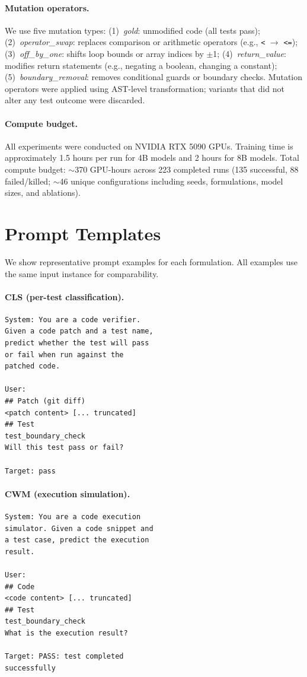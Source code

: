 \paragraph{Mutation operators.} We use five mutation types: (1)~\emph{gold}: unmodified code (all tests pass); (2)~\emph{operator\_swap}: replaces comparison or arithmetic operators (e.g., \texttt{<} $\to$ \texttt{<=}); (3)~\emph{off\_by\_one}: shifts loop bounds or array indices by $\pm$1; (4)~\emph{return\_value}: modifies return statements (e.g., negating a boolean, changing a constant); (5)~\emph{boundary\_removal}: removes conditional guards or boundary checks. Mutation operators were applied using AST-level transformation; variants that did not alter any test outcome were discarded.

\paragraph{Compute budget.}
All experiments were conducted on NVIDIA RTX 5090 GPUs. Training time is approximately 1.5 hours per run for 4B models and 2 hours for 8B models. Total compute budget: ${\sim}$370 GPU-hours across 223 completed runs (135 successful, 88 failed/killed; ${\sim}$46 unique configurations including seeds, formulations, model sizes, and ablations).

\section{Prompt Templates}
\label{app:prompts}

We show representative prompt examples for each formulation. All examples use the same input instance for comparability.

\paragraph{CLS (per-test classification).}
{\footnotesize\begin{verbatim}
System: You are a code verifier.
Given a code patch and a test name,
predict whether the test will pass
or fail when run against the
patched code.

User:
## Patch (git diff)
<patch content> [... truncated]
## Test
test_boundary_check
Will this test pass or fail?

Target: pass
\end{verbatim}}

\paragraph{CWM (execution simulation).}
{\footnotesize\begin{verbatim}
System: You are a code execution
simulator. Given a code snippet and
a test case, predict the execution
result.

User:
## Code
<code content> [... truncated]
## Test
test_boundary_check
What is the execution result?

Target: PASS: test completed
successfully
\end{verbatim}}

